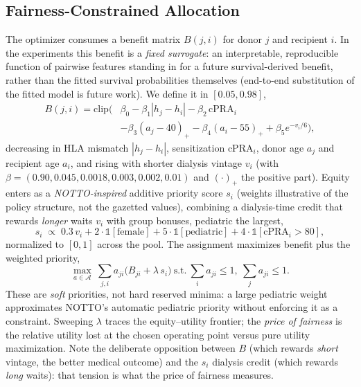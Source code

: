 \documentclass[journal]{IEEEtran}
\begin{document}
\subsection{Fairness-Constrained Allocation}
The optimizer consumes a benefit matrix $B(j,i)$ for donor $j$ and recipient $i$. In the experiments this benefit is a \emph{fixed surrogate}: an interpretable, reproducible function of pairwise features standing in for a future survival-derived benefit, rather than the fitted survival probabilities themselves (end-to-end substitution of the fitted model is future work). We define it in $[0.05,0.98]$,
\begin{equation}
\begin{aligned}
B(j,i)=\mathrm{clip}\big(&\beta_0-\beta_1|h_j-h_i|-\beta_2\,\mathrm{cPRA}_i\\[-1pt]
&-\beta_3(a_j-40)_+-\beta_4(a_i-55)_++\beta_5 e^{-v_i/6}\big),
\end{aligned}
\end{equation}
decreasing in HLA mismatch $|h_j-h_i|$, sensitization $\mathrm{cPRA}_i$, donor age $a_j$ and recipient age $a_i$, and rising with shorter dialysis vintage $v_i$ (with $\beta=(0.90,0.045,0.0018,0.003,0.002,0.01)$ and $(\cdot)_+$ the positive part). Equity enters as a \emph{NOTTO-inspired} additive priority score $s_i$ (weights illustrative of the policy structure, not the gazetted values), combining a dialysis-time credit that rewards \emph{longer} waits $v_i$ with group bonuses, pediatric the largest,
\begin{equation}
s_i \;\propto\; 0.3\,v_i + 2\cdot\mathbb{1}[\text{female}]+5\cdot\mathbb{1}[\text{pediatric}]+4\cdot\mathbb{1}[\text{cPRA}_i>80],
\end{equation}
normalized to $[0,1]$ across the pool. The assignment maximizes benefit plus the weighted priority,
\begin{equation}
\max_{a\in\mathcal A}\ \sum_{j,i}a_{ji}\big(B_{ji}+\lambda\,s_i\big)\ \text{s.t.}\ \textstyle\sum_i a_{ji}\le1,\ \sum_j a_{ji}\le1 .
\end{equation}
These are \emph{soft} priorities, not hard reserved minima: a large pediatric weight approximates NOTTO's automatic pediatric priority without enforcing it as a constraint. Sweeping $\lambda$ traces the equity--utility frontier; the \emph{price of fairness} is the relative utility lost at the chosen operating point versus pure utility maximization. Note the deliberate opposition between $B$ (which rewards \emph{short} vintage, the better medical outcome) and the $s_i$ dialysis credit (which rewards \emph{long} waits): that tension is what the price of fairness measures.
\end{document}
